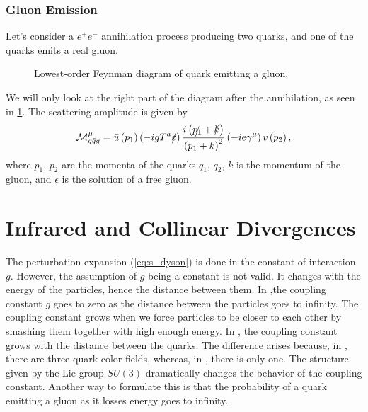 \subsubsection*{Gluon Emission}
Let's consider a $e^+e^-$ annihilation process producing two quarks, and one of the quarks emits a real gluon.
\begin{figure}[htb]
        \centering
    \caption{Lowest-order Feynman diagram of quark emitting a gluon.}
    \label{fig:qg_emission}
\end{figure}
We will only look at the right part of the diagram after the annihilation, as seen in \cref{fig:qg_emission}.
The scattering amplitude is given by \cite{qcd}
\begin{equation}
    \label{eq:g_emission}
    \mathcal{M}_{q \bar{q} g}^\mu=\bar{u}\left(p_1\right)\left(-i g T^a \slashed{\epsilon} \right) \frac{i\left(\slashed{p_1} +\slashed{k}\right)}{\left(p_1+k\right)^2}\left(-i e \gamma^\mu\right) v\left(p_2\right) ,
\end{equation}
where $p_1$, $p_2$ are the momenta of the quarks $q_1$, $q_2$, $k$ is the momentum of the gluon, and $\epsilon$ is the solution of a free gluon.



\section{Infrared and Collinear Divergences}
\label{sec:IR_div}
The perturbation expansion (\ref{eq:s_dyson}) is done in the constant of interaction $g$. 
However, the assumption of $g$ being a constant is not valid.
It changes with the energy of the particles, hence the distance between them. 
In \QED,the coupling constant $g$ goes to zero as the distance between the particles goes to infinity.
The coupling constant grows when we force particles to be closer to each other by smashing them together with high enough energy.
In \QCD, the coupling constant grows with the distance between the quarks.
The difference arises because, in \QCD, there are three quark color fields, whereas, in \QED, there is only one.
The structure given by the Lie group $SU(3)$ dramatically changes the behavior of the coupling constant.
Another way to formulate this is that the probability of a quark emitting a gluon as it losses energy goes to infinity.

